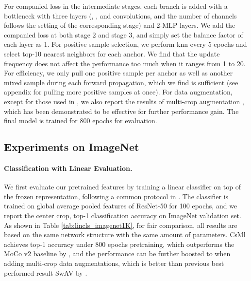 \documentclass[10pt,twocolumn,letterpaper]{article}
\begin{document}
For companied loss in the intermediate stages, each branch is added with a bottleneck with three layers (, , and  convolutions, and the number of channels follows the setting of the corresponding stage) and 2-MLP layers. We add the companied loss at both stage 2 and stage 3, and simply set the balance factor of each layer as 1.  For positive sample selection, we perform knn every 5 epochs and select top-10 nearest neighbors for each anchor. We find that the update frequency does not affect the performance too much when it ranges from 1 to 20. For efficiency, we only pull one positive sample per anchor as well as another mixed sample during each forward propagation, which we find is sufficient (see appendix for pulling more positive samples at once). For data augmentation, except for those used in \cite{he2020momentum}, we also report the results of multi-crop augmentation \cite{caron2020unsupervised}, which has been demonstrated to be effective for further performance gain. The final model is trained for 800 epochs for evaluation.

\subsection{Experiments on ImageNet}
\paragraph{Classification with Linear Evaluation.} We first evaluate our pretrained features by training a linear classifier on top of the frozen representation, following a common protocol in \cite{he2020momentum}. The classifier is trained on global average pooled features of ResNet-50 for 100 epochs, and we report the center crop, top-1 classification accuracy on ImageNet validation set. As shown in Table \ref{tab:lincls_imagenet1K}, for fair comparison, all results are based on the same network structure with the same amount of parameters. CsMl achieves  top-1 accuracy under 800 epochs pretraining, which outperforms the MoCo v2 baseline \cite{chen2020improved} by , and the performance can be further boosted to  when adding multi-crop data augmentations, which is better than previous best performed result SwAV by . 
\end{document}
